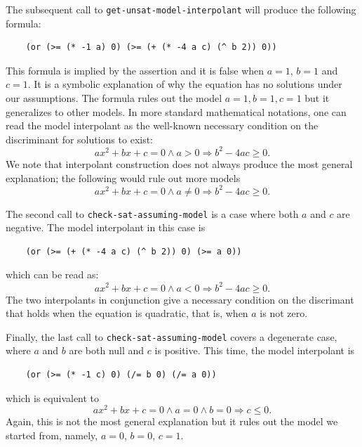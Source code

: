 \documentclass[11pt,twoside,fleqn,openright,titlepage]{cslreport}
\begin{document}
\medskip\noindent
The subsequent call to \texttt{get-unsat-model-interpolant} will produce the
following formula:
\begin{footnotesize}
\begin{verbatim}
    (or (>= (* -1 a) 0) (>= (+ (* -4 a c) (^ b 2)) 0))
\end{verbatim}
\end{footnotesize}
This formula is implied by the assertion and it is false when $a=1$,
$b=1$ and $c=1$. It is a symbolic explanation of why the equation has
no solutions under our assumptions. The formula rules out the model
$a=1, b=1, c=1$ but it generalizes to other models. In more standard
mathematical notations, one can read the model interpolant as the
well-known necessary condition on the discriminant for solutions to
exist:
\begin{displaymath}
   a x^2 + b x + c = 0 \wedge a > 0 \Rightarrow b^2-4ac \geq 0.
\end{displaymath}
We note that interpolant construction does not always produce the most
general explanation; the following would rule out more
models
\begin{displaymath}
   a x^2 + b x + c = 0 \wedge a \neq 0 \Rightarrow b^2-4ac \geq 0.
\end{displaymath}

\medskip\noindent The second call to \texttt{check-sat-assuming-model}
is a case where both $a$ and $c$ are negative. The model interpolant
in this case is
\begin{footnotesize}
\begin{verbatim}
    (or (>= (+ (* -4 a c) (^ b 2)) 0) (>= a 0))
\end{verbatim}
\end{footnotesize}
which can be read as:
\begin{displaymath}
   a x^2 + b x + c = 0 \wedge a < 0 \Rightarrow b^2-4ac \geq 0.
\end{displaymath}
The two interpolants in conjunction give a necessary condition on the
discrimant that holds when the equation is quadratic, that is, when
$a$ is not zero.

\medskip\noindent 
Finally, the last call to \texttt{check-sat-assuming-model} covers a
degenerate case, where $a$ and $b$ are both null and $c$ is positive. 
This time, the model interpolant is 
\begin{footnotesize}
\begin{verbatim}
    (or (>= (* -1 c) 0) (/= b 0) (/= a 0))
\end{verbatim}
\end{footnotesize}
which is equivalent to
\begin{displaymath}
   a x^2 + b x + c = 0 \wedge a = 0 \wedge b = 0 \Rightarrow c \leq 0.
\end{displaymath}
Again, this is not the most general explanation but it rules out the
model we started from, namely, $a=0$, $b=0$, $c=1$.
\end{document}

